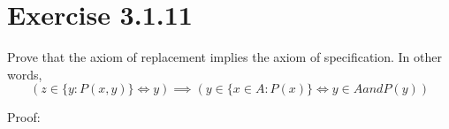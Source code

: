 \documentclass[../../main.tex]{subfiles}
\begin{document}
\maketitle

\section{Exercise 3.1.11}

Prove that the axiom of replacement implies the axiom of specification. In other words,
\begin{equation}
    (
        z \in \{  y:P(x,y) \} 
        \iff
        y 
    )
    \implies
    (
        y \in \{ x \in A : P(x) \}
        \iff
        y \in A and P(y)
    )  
\end{equation}

Proof: 
\end{document}
